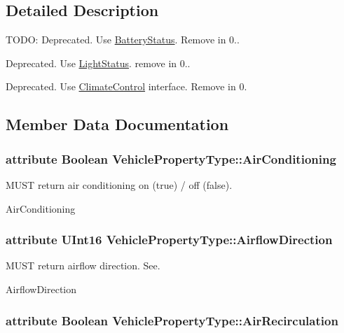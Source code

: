 \subsection{Detailed Description}
T\+O\+D\+O\+: Deprecated. Use \hyperlink{interfaceBatteryStatus}{Battery\+Status}. Remove in 0.. 

Deprecated. Use \hyperlink{interfaceLightStatus}{Light\+Status}. remove in 0..

Deprecated. Use \hyperlink{interfaceClimateControl}{Climate\+Control} interface. Remove in 0. 

\subsection{Member Data Documentation}
\hypertarget{interfaceVehiclePropertyType_ad28c5e04a201798b91e67206421f01d3}{
\subsubsection[{Air\+Conditioning}]{\setlength{\rightskip}{0pt plus 5cm}attribute Boolean Vehicle\+Property\+Type\+::\+Air\+Conditioning}}\label{interfaceVehiclePropertyType_ad28c5e04a201798b91e67206421f01d3}


M\+U\+S\+T return air conditioning on (true) / off (false). 

Air\+Conditioning \hypertarget{interfaceVehiclePropertyType_a327f430820e8e67a77ca4dc1d15f78ca}{
\subsubsection[{Airflow\+Direction}]{\setlength{\rightskip}{0pt plus 5cm}attribute U\+Int16 Vehicle\+Property\+Type\+::\+Airflow\+Direction}}\label{interfaceVehiclePropertyType_a327f430820e8e67a77ca4dc1d15f78ca}


M\+U\+S\+T return airflow direction. See. 

Airflow\+Direction \hypertarget{interfaceVehiclePropertyType_a0e02b02f90dae7cc3ab8ac559f274bd2}{
\subsubsection[{Air\+Recirculation}]{\setlength{\rightskip}{0pt plus 5cm}attribute Boolean Vehicle\+Property\+Type\+::\+Air\+Recirculation}}\label{interfaceVehiclePropertyType_a0e02b02f90dae7cc3ab8ac559f274bd2}


